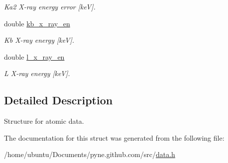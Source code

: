 \begin{DoxyCompactItemize}
\begin{DoxyCompactList}\small\item\em Ka2 X-\/ray energy error \mbox{[}keV\mbox{]}. \end{DoxyCompactList}\item 
double \hyperlink{structpyne_1_1atomic_aa93013778d65dc071c27564449e351de}{kb\+\_\+x\+\_\+ray\+\_\+en}\hypertarget{structpyne_1_1atomic_aa93013778d65dc071c27564449e351de}{}\label{structpyne_1_1atomic_aa93013778d65dc071c27564449e351de}

\begin{DoxyCompactList}\small\item\em Kb X-\/ray energy \mbox{[}keV\mbox{]}. \end{DoxyCompactList}\item 
double \hyperlink{structpyne_1_1atomic_a43e9e36e9b5bd8e4e77ffbe86b5ef28d}{l\+\_\+x\+\_\+ray\+\_\+en}\hypertarget{structpyne_1_1atomic_a43e9e36e9b5bd8e4e77ffbe86b5ef28d}{}\label{structpyne_1_1atomic_a43e9e36e9b5bd8e4e77ffbe86b5ef28d}

\begin{DoxyCompactList}\small\item\em L X-\/ray energy \mbox{[}keV\mbox{]}. \end{DoxyCompactList}\end{DoxyCompactItemize}


\subsection{Detailed Description}
Structure for atomic data. 

The documentation for this struct was generated from the following file\+:\begin{DoxyCompactItemize}
\item 
/home/ubuntu/\+Documents/pyne.\+github.\+com/src/\hyperlink{data_8h}{data.\+h}\end{DoxyCompactItemize}
